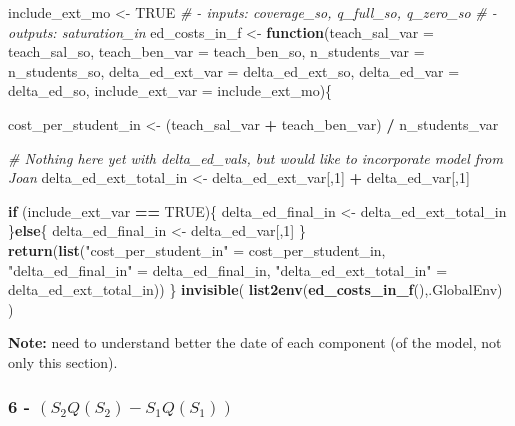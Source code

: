 \documentclass[]{article}
\newenvironment{Shaded}{\begin{snugshade}}{\end{snugshade}}
\newcommand{\CommentTok}[1]{\textcolor[rgb]{0.56,0.35,0.01}{\textit{#1}}}
\newcommand{\ControlFlowTok}[1]{\textcolor[rgb]{0.13,0.29,0.53}{\textbf{#1}}}
\newcommand{\DataTypeTok}[1]{\textcolor[rgb]{0.13,0.29,0.53}{#1}}
\newcommand{\DecValTok}[1]{\textcolor[rgb]{0.00,0.00,0.81}{#1}}
\newcommand{\KeywordTok}[1]{\textcolor[rgb]{0.13,0.29,0.53}{\textbf{#1}}}
\newcommand{\NormalTok}[1]{#1}
\newcommand{\OperatorTok}[1]{\textcolor[rgb]{0.81,0.36,0.00}{\textbf{#1}}}
\newcommand{\OtherTok}[1]{\textcolor[rgb]{0.56,0.35,0.01}{#1}}
\newcommand{\StringTok}[1]{\textcolor[rgb]{0.31,0.60,0.02}{#1}}
\begin{document}
\begin{Shaded}
\begin{Highlighting}[]
\NormalTok{include_ext_mo <-}\StringTok{ }\OtherTok{TRUE}
\CommentTok{# - inputs: coverage_so, q_full_so, q_zero_so }
\CommentTok{# - outputs: saturation_in }
\NormalTok{ed_costs_in_f <-}\StringTok{ }\ControlFlowTok{function}\NormalTok{(}\DataTypeTok{teach_sal_var =}\NormalTok{ teach_sal_so, }\DataTypeTok{teach_ben_var =}\NormalTok{ teach_ben_so, }
                          \DataTypeTok{n_students_var =}\NormalTok{ n_students_so, }\DataTypeTok{delta_ed_ext_var =}\NormalTok{ delta_ed_ext_so,}
                          \DataTypeTok{delta_ed_var =}\NormalTok{ delta_ed_so, }\DataTypeTok{include_ext_var =}\NormalTok{ include_ext_mo)\{}
    
\NormalTok{    cost_per_student_in <-}\StringTok{ }\NormalTok{(teach_sal_var }\OperatorTok{+}\StringTok{ }\NormalTok{teach_ben_var) }\OperatorTok{/}\StringTok{ }\NormalTok{n_students_var}
    
    \CommentTok{# Nothing here yet with delta_ed_vals, but would like to incorporate model from Joan}
\NormalTok{    delta_ed_ext_total_in <-}\StringTok{ }\NormalTok{delta_ed_ext_var[,}\DecValTok{1}\NormalTok{] }\OperatorTok{+}\StringTok{ }\NormalTok{delta_ed_var[,}\DecValTok{1}\NormalTok{]}
    
    \ControlFlowTok{if}\NormalTok{ (include_ext_var }\OperatorTok{==}\StringTok{ }\OtherTok{TRUE}\NormalTok{)\{}
\NormalTok{      delta_ed_final_in <-}\StringTok{  }\NormalTok{delta_ed_ext_total_in}
\NormalTok{    \}}\ControlFlowTok{else}\NormalTok{\{}
\NormalTok{      delta_ed_final_in <-}\StringTok{ }\NormalTok{delta_ed_var[,}\DecValTok{1}\NormalTok{]}
\NormalTok{    \}}
    \KeywordTok{return}\NormalTok{(}\KeywordTok{list}\NormalTok{(}\StringTok{"cost_per_student_in"}\NormalTok{ =}\StringTok{ }\NormalTok{cost_per_student_in, }\StringTok{"delta_ed_final_in"}\NormalTok{ =}\StringTok{ }
\StringTok{                  }\NormalTok{delta_ed_final_in,  }\StringTok{"delta_ed_ext_total_in"}\NormalTok{ =}\StringTok{ }\NormalTok{delta_ed_ext_total_in)) }
\NormalTok{\} }
\KeywordTok{invisible}\NormalTok{( }\KeywordTok{list2env}\NormalTok{(}\KeywordTok{ed_costs_in_f}\NormalTok{(),.GlobalEnv) )}
\end{Highlighting}
\end{Shaded}

\textbf{Note:} need to understand better the date of each component (of
the model, not only this section).

\hypertarget{left-s_2qs_2---s_1qs_1-right}{%
\subsubsection{\texorpdfstring{6 -
\(\left( S_{2}Q(S_{2}) - S_{1}Q(S_{1}) \right)\)}{6 - \textbackslash{}left( S\_\{2\}Q(S\_\{2\}) - S\_\{1\}Q(S\_\{1\}) \textbackslash{}right)}}\label{left-s_2qs_2---s_1qs_1-right}}
\end{document}
